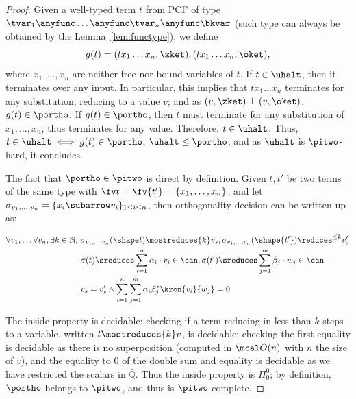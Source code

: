 \begin{proof}
  Given a well-typed term $t$ from PCF of type $\tvar_1 \anyfunc
  \dots \anyfunc \tvar_n \anyfunc \bkvar$
  (such type can always be obtained by the Lemma~\ref{lem:functype}),
  we define
  \[
    g(t) = (tx_1\dots x_n, \zket), (tx_1\dots x_n, \oket),
  \]
  where $x_1, \dots, x_n$ are neither free nor bound variables of $t$.
  If $t \in \uhalt$, then it terminates over any input.
  In particular, this implies that $tx_1 \dots x_n$ terminates for
  any substitution, reducing to a value $v$;
  and as $(v, \zket) \perp (v, \oket)$, $g(t) \in \portho$.
  If $g(t) \in \portho$, then $t$ must terminate for any substitution
  of $x_1, \dots, x_n$, thus terminates for any value.
  Therefore, $t \in \uhalt$.
  Thus, $t \in \uhalt \iff g(t) \in \portho$, $\uhalt \leq
  \portho$, and as $\uhalt$ is $\pitwo$-hard, it concludes.

  The fact that $\portho \in \pitwo$ is direct by definition.
  Given $t, t'$ be two terms of the same type with $\fv t = \fv{t'} =
  \{x_1, \dots, x_n\}$, and let $\sigma_{v_1, \dots, v_n} = \{x_i
  \subarrow v_i\}_{1 \leq i \leq n}$, then orthogonality decision can
  be written up as:

  \[
    \begin{aligned}
      \forall v_1, \dots \forall v_n, \exists k \in \mathbb
      N,\ &\sigma_{v_1, \dots, v_n}(\shape t) \mostreduces{k} v_s,
      \sigma_{v_1, \dots, v_n}(\shape{t'}) \reduces^{\leq k} v_s'  \\
      &\sigma(t) \sreduces \sum_{i=1}^n \alpha_i \cdot v_i \in
      \can, \sigma(t') \sreduces \sum_{j=1}^m \beta_j \cdot w_j
      \in \can \\
      & v_s = v_s' \wedge \sum_{i=1}^n \sum_{j=1}^m \alpha_i
      \beta_j^* \kron{v_i}{w_j} = 0
    \end{aligned}
  \]

  The inside property is decidable: checking if a term reducing in
  less than $k$ steps to a variable, written $t \mostreduces{k} v$,
  is decidable; checking the first equality is decidable as there is
  no superposition (computed in $\mcal O(n)$ with $n$ the size of
  $v$), and the equality to $0$ of the double sum and equality is
  decidable as we have restricted the scalars in $\bar{\mathbb Q}$.
  Thus the inside property is $\Pi_0^0$; by definition, $\portho$
  belongs to $\pitwo$, and thus is $\pitwo$-complete. \qedhere

\end{proof}

\ortholower*

